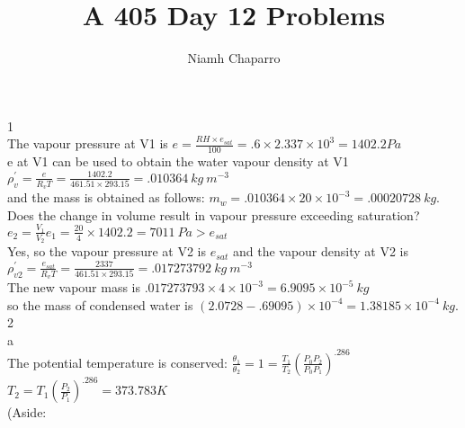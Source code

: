 \documentclass[11pt]{article} %
\title{A 405 Day 12 Problems}
\author{Niamh Chaparro}
\begin{document}
\maketitle

1\\

The vapour pressure at V1 is $e = \frac{RH \times e_{sat}}{100} = .6 \times 2.337 \times 10^{3}  = 1402.2 Pa$\\

e at V1 can be used to obtain the water vapour density at V1\\

$\rho_v^{'} = \frac{e}{R_{v}T} = \frac{1402.2}{461.51 \times 293.15} = .010364 \ kg \ m^{-3}$\\

and the mass is obtained as follows: $m_{w} = .010364 \times 20 \times 10^{-3} = .00020728 \ kg$.\\

Does the change in volume result in vapour pressure exceeding saturation?\\

$e_{2} = \frac{V_{1}}{V_{2}}e_{1} = \frac{20}{4}\times 1402.2 = 7011 \ Pa > e_{sat}$\\

Yes, so the vapour pressure at V2 is $e_{sat}$ and the vapour density at V2 is\\

$ \rho_{v2}^{'} = \frac{e_{sat}}{R_{v}T} = \frac{2337}{461.51 \times 293.15} = .017273792 \ kg \ m^{-3}$\\

The new vapour mass is $.017273793 \times 4 \times 10^{-3} = 6.9095 \times 10^{-5} \ kg$\\

so the mass of condensed water is  $(2.0728 - .69095) \times 10^{-4} = 1.38185 \times 10^{-4} \ kg$.\\


2\\

a\\

The potential temperature is conserved: $\frac{\theta_{1}}{\theta_{2}} = 1 = \frac{T_{1}}{T_{2}}(\frac{P_{0}P_{2}}{P_{0}P_{1}})^{.286}$\\

$T_{2} = T_{1}(\frac{P_{2}}{P_{1}})^{.286} = 373.783 K$\\

(Aside:\\
\end{document}

